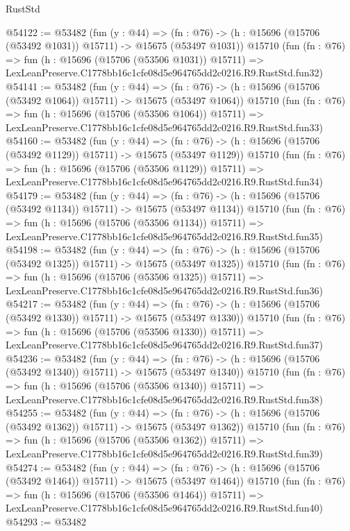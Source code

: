 \begin{lexlean}{RustStd}
\begin{coremodule}
@54122 := @53482
    (fun (y : @44) =>
    (fn : @76) -> (h : @15696 (@15706 (@53492 @1031)) @15711) -> @15675 (@53497 @1031))
    @15710
    (fun (fn : @76) =>
    fun (h : @15696 (@15706 (@53506 @1031)) @15711) =>
    LexLeanPreserve.C1778bb16c1cfe08d5e964765dd2c0216.R9.RustStd.fun32)
@54141 := @53482
    (fun (y : @44) =>
    (fn : @76) -> (h : @15696 (@15706 (@53492 @1064)) @15711) -> @15675 (@53497 @1064))
    @15710
    (fun (fn : @76) =>
    fun (h : @15696 (@15706 (@53506 @1064)) @15711) =>
    LexLeanPreserve.C1778bb16c1cfe08d5e964765dd2c0216.R9.RustStd.fun33)
@54160 := @53482
    (fun (y : @44) =>
    (fn : @76) -> (h : @15696 (@15706 (@53492 @1129)) @15711) -> @15675 (@53497 @1129))
    @15710
    (fun (fn : @76) =>
    fun (h : @15696 (@15706 (@53506 @1129)) @15711) =>
    LexLeanPreserve.C1778bb16c1cfe08d5e964765dd2c0216.R9.RustStd.fun34)
@54179 := @53482
    (fun (y : @44) =>
    (fn : @76) -> (h : @15696 (@15706 (@53492 @1134)) @15711) -> @15675 (@53497 @1134))
    @15710
    (fun (fn : @76) =>
    fun (h : @15696 (@15706 (@53506 @1134)) @15711) =>
    LexLeanPreserve.C1778bb16c1cfe08d5e964765dd2c0216.R9.RustStd.fun35)
@54198 := @53482
    (fun (y : @44) =>
    (fn : @76) -> (h : @15696 (@15706 (@53492 @1325)) @15711) -> @15675 (@53497 @1325))
    @15710
    (fun (fn : @76) =>
    fun (h : @15696 (@15706 (@53506 @1325)) @15711) =>
    LexLeanPreserve.C1778bb16c1cfe08d5e964765dd2c0216.R9.RustStd.fun36)
@54217 := @53482
    (fun (y : @44) =>
    (fn : @76) -> (h : @15696 (@15706 (@53492 @1330)) @15711) -> @15675 (@53497 @1330))
    @15710
    (fun (fn : @76) =>
    fun (h : @15696 (@15706 (@53506 @1330)) @15711) =>
    LexLeanPreserve.C1778bb16c1cfe08d5e964765dd2c0216.R9.RustStd.fun37)
@54236 := @53482
    (fun (y : @44) =>
    (fn : @76) -> (h : @15696 (@15706 (@53492 @1340)) @15711) -> @15675 (@53497 @1340))
    @15710
    (fun (fn : @76) =>
    fun (h : @15696 (@15706 (@53506 @1340)) @15711) =>
    LexLeanPreserve.C1778bb16c1cfe08d5e964765dd2c0216.R9.RustStd.fun38)
@54255 := @53482
    (fun (y : @44) =>
    (fn : @76) -> (h : @15696 (@15706 (@53492 @1362)) @15711) -> @15675 (@53497 @1362))
    @15710
    (fun (fn : @76) =>
    fun (h : @15696 (@15706 (@53506 @1362)) @15711) =>
    LexLeanPreserve.C1778bb16c1cfe08d5e964765dd2c0216.R9.RustStd.fun39)
@54274 := @53482
    (fun (y : @44) =>
    (fn : @76) -> (h : @15696 (@15706 (@53492 @1464)) @15711) -> @15675 (@53497 @1464))
    @15710
    (fun (fn : @76) =>
    fun (h : @15696 (@15706 (@53506 @1464)) @15711) =>
    LexLeanPreserve.C1778bb16c1cfe08d5e964765dd2c0216.R9.RustStd.fun40)
@54293 := @53482

\end{coremodule}
\end{lexlean}
